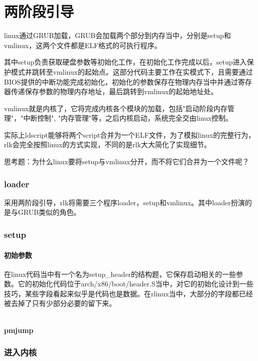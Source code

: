 \chapter{两阶段引导}
linux通过GRUB加载，GRUB会加载两个部分到内存当中，分别是setup和vmlinux，这两个文件都是ELF格式的可执行程序。

其中setup负责获取硬盘参数等初始化工作，在初始化工作完成以后，setup进入保护模式并跳转至vmlinux的起始点。这部分代码主要工作在实模式下，且需要通过BIOS提供的中断功能完成初始化，初始化的参数保存在物理内存当中并通过寄存器传递保存参数的物理内存地址，最后跳转到vmlinux的起始地址处。

vmlinux就是内核了，它将完成内核各个模块的加载，包括"启动阶段内存管理"，"中断控制", "内存管理"等，之后内核启动，系统完全交由linux控制。

实际上ldscript能够将两个script合并为一个ELF文件，为了模拟linux的完整行为，rlk会完全按照linux的方式实现，不同的是rlk大大简化了实现细节。

思考题：为什么linux要将setup与vmlinux分开，而不将它们合并为一个文件呢？

\subsection{loader}
采用两阶段引导，rlk将需要三个程序loader，setup和vmlinux。其中loader扮演的是与GRUB类似的角色。

\subsection{setup}
\subsubsection{初始参数}
在linux代码当中有一个名为setup_header的结构题，它保存启动相关的一些参数。它的初始化代码位于arch/x86/boot/header.S当中，对它的初始化设计到一些技巧，某些字段看起来似乎是代码也是数据。在rlinux当中，大部分的字段都已经被去掉了只有少部分必要的留下来。
\begin{lstlisting}
\end{lstlisting}

\subsubsection{pmjump}
\subsection{进入内核}


